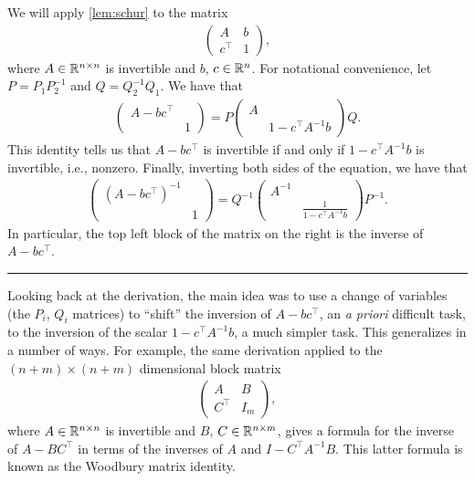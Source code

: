 \documentclass{article}
\begin{document}
We will apply \cref{lem:schur} to the matrix
\begin{align*}
\begin{pmatrix}
	A & b\\
	c^\intercal & 1
\end{pmatrix},
\end{align*}
where $A\in{\mathbb{R}}^{n\times n}$ is invertible and $b$, $c\in{\mathbb{R}}^n$.
For notational convenience, let $P = P_1P_2^{-1}$ and $Q = Q_2^{-1}Q_1$.
We have that
\begin{align*}
\begin{pmatrix}
	A - bc^\intercal & \\
	& 1
\end{pmatrix} = P \begin{pmatrix}
	A & \\ & 1 - c^\intercal A^{-1}b
\end{pmatrix}Q.
\end{align*}
This identity tells us that $A-bc^\intercal$ is invertible if and only if $1 - c^\intercal A^{-1}b$ is invertible, i.e., nonzero.
Finally, inverting both sides of the equation, we have that
\begin{align*}
\begin{pmatrix}
	(A-bc^\intercal)^{-1} & \\
	& 1
\end{pmatrix} = 
Q^{-1}\begin{pmatrix}
	A^{-1} &\\
	& \tfrac{1}{1- c^\intercal A^{-1}b}
\end{pmatrix}P^{-1}.
\end{align*}
In particular, the top left block of the matrix on the right is the inverse of $A - bc^\intercal$.

\rule{0.5\linewidth}{\linethickness}

Looking back at the derivation, the main idea was to use a change of variables (the $P_i$, $Q_i$ matrices) to ``shift'' the inversion of $A - bc^\intercal$, an \textit{a priori} difficult task, to the inversion of the scalar $1 - c^\intercal A^{-1}b$, a much simpler task. This generalizes in a number of ways. For example, the same derivation applied to the $(n+m)\times(n+m)$ dimensional block matrix 
\begin{align*}
\begin{pmatrix}
	A & B\\
	C^\intercal & I_m
\end{pmatrix},
\end{align*}
where $A\in{\mathbb{R}}^{n\times n}$ is invertible and $B$, $C\in{\mathbb{R}}^{n\times m}$, gives a formula for the inverse of $A - BC^\intercal$ in terms of the inverses of $A$ and $I - C^\intercal A^{-1}B$. This latter formula is known as the Woodbury matrix identity.
\end{document}
